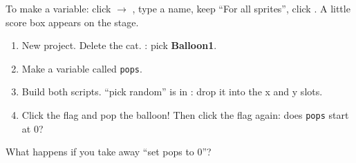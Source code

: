 To make a variable: click  $\rightarrow$ , type a name, keep \enquote{For all sprites}, click . A little score box appears on the stage.

\begin{exercise}
\begin{enumerate}[leftmargin=1.4em,itemsep=1pt]
  \item New project. Delete the cat. : pick \textbf{Balloon1}.
  \item Make a variable called \texttt{pops}.
  \item Build both scripts. \enquote{pick random} is in : drop it into the x and y slots.
  \item Click the flag and pop the balloon! Then click the flag again: does \texttt{pops} start at 0?
\end{enumerate}
\begin{center}
\begin{scratch}[scale=0.8]
\end{scratch}
\hspace{0.5cm}
\begin{scratch}[scale=0.8]
\end{scratch}
\end{center}
What happens if you take away \enquote{set pops to 0}? 
\end{exercise}


